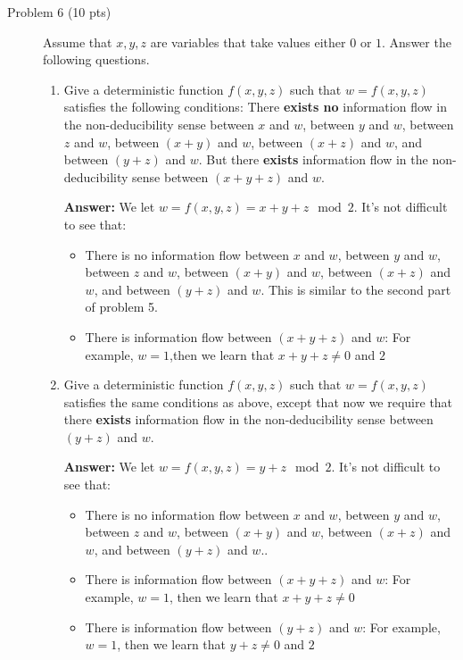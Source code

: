\documentclass[11pt]{article}
\newcommand{\ans}[1]{\begin{mdframed}\textbf{Answer: }#1\end{mdframed}}
\begin{document}
\begin{description}
 \item[Problem 6 (10 pts)]
Assume that $x,y,z$ are variables that take values either $0$ or $1$.  Answer the following questions.

\begin{enumerate}
 \item
Give a deterministic function $f(x,y,z)$ such that $w=f(x,y,z)$ satisfies the following conditions: There \textbf{exists no} information flow in the non-deducibility sense between $x$ and $w$, between $y$ and $w$, between $z$ and $w$, between $(x+y)$ and $w$, between $(x+z)$ and $w$, and between $(y+z)$ and $w$.  But there \textbf{exists} information flow in the non-deducibility sense between $(x+y+z)$ and $w$.
  \ans{
    We let $w=f(x,y,z) = x+y+z\mod 2$. It's not difficult to see that:
    \begin{itemize}
      \item 
      There is no information flow between $x$ and $w$, between $y$ and $w$, between $z$ and $w$, between $(x+y)$ and $w$, between $(x+z)$ and $w$, and between $(y+z)$ and $w$. This is similar to the second part of problem 5. 
      \item 
      There is information flow between $(x+y+z)$ and $w$: For example, $w=1$,then we learn that  $x+y+z\neq 0$ and $2$
    \end{itemize}

  }
 \item
Give a deterministic function $f(x,y,z)$ such that $w=f(x,y,z)$ satisfies the same conditions as above, except that now we require that
there \textbf{exists} information flow in the non-deducibility sense between $(y+z)$ and $w$.
  \ans{
    We let $w=f(x,y,z) = y+z\mod 2$. It's not difficult to see that:
    \begin{itemize}
    \item 
    There is no information flow between $x$ and $w$, between $y$ and $w$, between $z$ and $w$, between $(x+y)$ and $w$, between $(x+z)$ and $w$, and between $(y+z)$ and $w$.. 
    \item 
    There is information flow between $(x+y+z)$ and $w$: For example, $w=1$, then we learn that  $x+y+z\neq 0$

    \item 
    There is information flow between $(y+z)$ and $w$: For example, $w=1$, then we learn that $y+z\neq 0$ and $2$
    \end{itemize}
  }
\end{enumerate}




\end{description}
\end{document}
